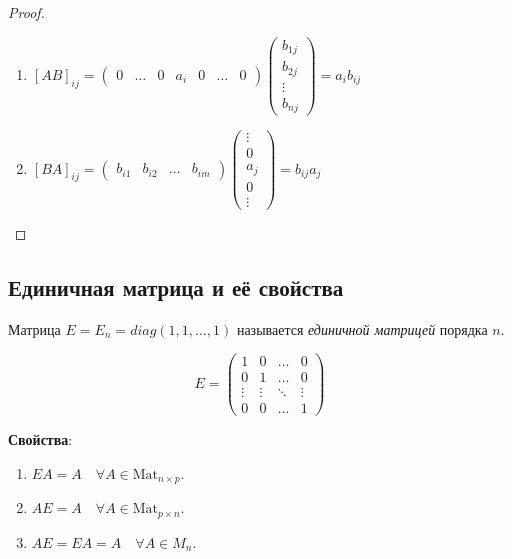\begin{proof}~
    \begin{enumerate}
    \item $[AB]_{ij} = \begin{pmatrix} 0 & \dots & 0 & a_i & 0 & \dots & 0\end{pmatrix} \begin{pmatrix} b_{1j} \\ b_{2j} \\ \vdots \\ b_{nj} \end{pmatrix} = a_i b_{ij} $
    \item $[BA]_{ij} = \begin{pmatrix} b_{i1} & b_{i2} & \dots & b_{im} \end{pmatrix} \begin{pmatrix} \vdots \\ 0 \\ a_j \\ 0 \\ \vdots \end{pmatrix} = b_{ij} a_j$ 
    \end{enumerate}
\end{proof}

\subsection{Единичная матрица и её свойства}
\begin{definition}
    Матрица $E = E_n = diag(1, 1, \dots, 1)$ называется \textit{единичной матрицей} порядка $n$. 

    \begin{equation*}
        E = \begin{pmatrix} 
            1 & 0 & \dots & 0 \\
            0 & 1 & \dots & 0 \\
            \vdots & \vdots & \ddots & \vdots \\
            0 & 0 & \dots & 1
        \end{pmatrix} 
    \end{equation*}
\end{definition}

\textbf{Свойства}:
\begin{enumerate}
    \item $EA = A \quad \forall A \in \text{Mat}_{n \times p}$.
    \item $AE = A \quad \forall A \in \text{Mat}_{p \times n}$.
    \item $AE = EA = A \quad \forall A \in M_n$.
\end{enumerate}


